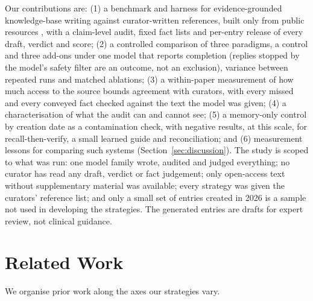 \documentclass{article} %
\begin{document}
Our contributions are: (1) a benchmark and harness for evidence-grounded knowledge-base writing against curator-written references, built only from public resources \citep{sayers2026database,Louden2020MedgenNcbis,rosonovski2024europe,seal2023genenames}, with a claim-level audit, fixed fact lists and per-entry release of every draft, verdict and score; (2) a controlled comparison of three paradigms, a control and three add-ons under one model that reports completion (replies stopped by the model's safety filter are an outcome, not an exclusion), variance between repeated runs and matched ablations; (3) a within-paper measurement of how much access to the source bounds agreement with curators, with every missed and every conveyed fact checked against the text the model was given; (4) a characterisation of what the audit can and cannot see; (5) a memory-only control by creation date as a contamination check, with negative results, at this scale, for recall-then-verify, a small learned guide and reconciliation; and (6) measurement lessons for comparing such systems (Section~\ref{sec:discussion}). The study is scoped to what was run: one model family wrote, audited and judged everything; no curator has read any draft, verdict or fact judgement; only open-access text without supplementary material was available; every strategy was given the curators' reference list; and only a small set of entries created in 2026 is a sample not used in developing the strategies. The generated entries are drafts for expert review, not clinical guidance.

\section{Related Work}
\label{sec:related_work}
We organise prior work along the axes our strategies vary.
\end{document}
